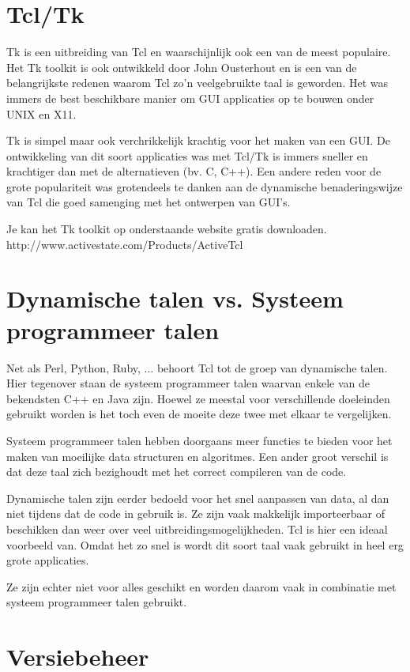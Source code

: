 \documentclass{article}
\begin{document}
\begin{flushleft}
\section{Tcl/Tk}
Tk is een uitbreiding van Tcl en waarschijnlijk ook een van de meest populaire. Het Tk toolkit is ook ontwikkeld door John Ousterhout en is een van de belangrijkste redenen waarom Tcl zo'n veelgebruikte taal is geworden. Het was immers de best beschikbare manier om GUI applicaties op te bouwen onder UNIX en X11. \medskip

Tk is simpel maar ook verchrikkelijk krachtig voor het maken van een GUI. De ontwikkeling van dit soort applicaties was met Tcl/Tk is immers sneller en krachtiger dan met de alternatieven (bv. C, C++). Een andere reden voor de grote populariteit was grotendeels te danken aan de dynamische benaderingswijze van Tcl die goed samenging met het ontwerpen van GUI's.\medskip

Je kan het Tk toolkit op onderstaande website gratis downloaden.\\
http://www.activestate.com/Products/ActiveTcl
\section{Dynamische talen vs. Systeem programmeer talen}
Net als Perl, Python, Ruby, ... behoort Tcl tot de groep van dynamische talen. Hier tegenover staan de systeem programmeer talen waarvan enkele van de bekendsten C++ en Java zijn. Hoewel ze meestal voor verschillende doeleinden gebruikt worden is het toch even de moeite deze twee met elkaar te vergelijken.\medskip

Systeem programmeer talen hebben doorgaans meer functies te bieden voor het maken van moeilijke data structuren en algoritmes. Een ander groot verschil is dat deze taal zich bezighoudt met het correct compileren van de code.\medskip

Dynamische talen zijn eerder bedoeld voor het snel aanpassen van data, al dan niet tijdens dat de code in gebruik is. Ze zijn vaak makkelijk importeerbaar of beschikken dan weer over veel uitbreidingsmogelijkheden. Tcl is hier een ideaal voorbeeld van. Omdat het zo snel is wordt dit soort taal vaak gebruikt in heel erg grote applicaties.\medskip

Ze zijn echter niet voor alles geschikt en worden daarom vaak in combinatie met systeem programmeer talen gebruikt.
\section{Versiebeheer}

\end{flushleft}
\end{document}
